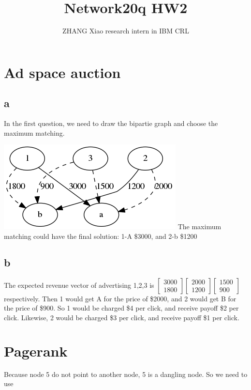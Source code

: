 \documentclass[12pt,a4paper]{article}
\author{ZHANG Xiao  research intern in IBM CRL}
\title{Network20q HW2}
\begin{document}
\maketitle
\pagebreak

\section{Ad space auction}
\subsection{a}
In the first question, we need to draw the bipartie graph and choose the maximum matching.

\includegraphics[width=\textwidth]{PIC/a.png}
The maximum matching could have the final solution: 1-A \$3000, and 2-b \$1200
\subsection{b}
The expected revenue vector of advertising 1,2,3 is
$
\begin{bmatrix}
    3000 \\
    1800
\end{bmatrix}
\begin{bmatrix}
    2000 \\
    1200
\end{bmatrix}
\begin{bmatrix}
    1500 \\
    900
\end{bmatrix}
$
respectively.
Then 1 would get A for the price of \$2000, and 2 would get B for the price of \$900.
So 1 would be charged \$4 per click, and receive payoff \$2 per click. Likewise, 2 would be charged \$3 per click, and receive payoff \$1 per click.

\section{Pagerank}
Because node 5 do not point to another node, 5 is a dangling node. So we need to use
\end{document}
